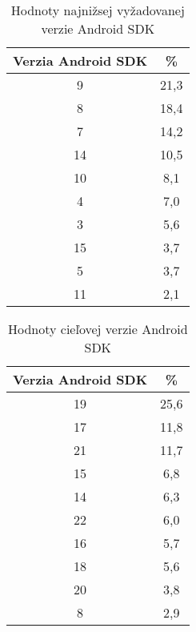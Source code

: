\begin{table}[htb]
\centering
  \begin{tabular}{|c c|}
    \hline
    \textbf{Verzia Android SDK} & \textbf{\%} \\\hline\hline
    9 & 21,3 \\
    8 & 18,4 \\
    7 & 14,2 \\
    14 & 10,5 \\
    10 & 8,1 \\
    4 & 7,0 \\
    3 & 5,6 \\
    15 & 3,7 \\
    5 & 3,7 \\
    11 & 2,1\\
    \hline
  \end{tabular}
  \caption{Hodnoty najnižsej vyžadovanej verzie Android SDK}
  \label{tab:minSdk}
\end{table}

\begin{table}[htb]
\centering
  \begin{tabular}{|c c|}
    \hline
    \textbf{Verzia Android SDK} & \textbf{\%} \\\hline\hline
    19 & 25,6 \\
    17 & 11,8 \\
    21 & 11,7 \\
    15 & 6,8 \\
    14 & 6,3 \\
    22 & 6,0\\
    16 & 5,7 \\
    18 & 5,6 \\
    20 & 3,8 \\
    8 & 2,9\\
    \hline
  \end{tabular}
  \caption{Hodnoty cieľovej verzie Android SDK}
  \label{tab:targetSdk}
\end{table}